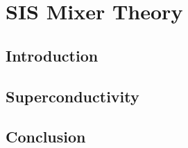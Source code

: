 
\chapter{SIS Mixer Theory}\label{chp:mixer}


\section{Introduction}

\lipsum[2-4]


\section{Superconductivity}\label{sec:mixer:intro}

\lipsum[2-4]


\section{Conclusion}

\lipsum[2-4]
